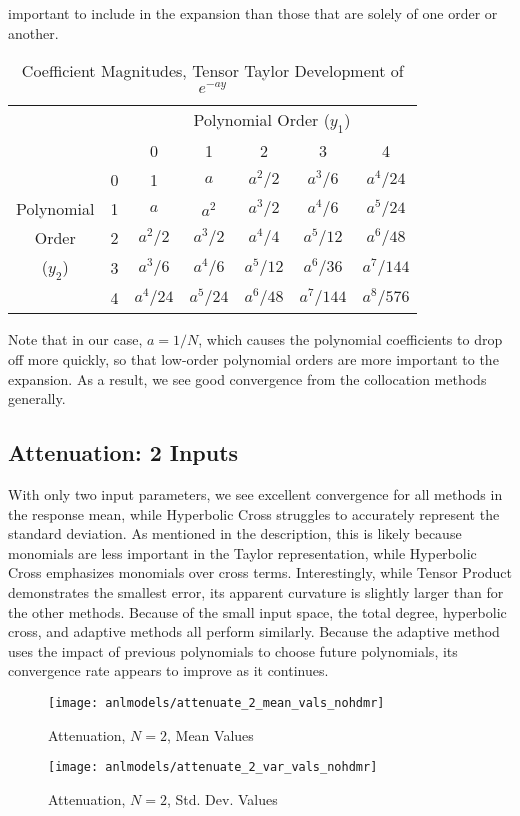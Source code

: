 important to include in the expansion than those that are solely of one order or another.
\begin{table}
  \centering
  \begin{tabular}{|c c|c c c c c|}
    \cline{3-7}\multicolumn{2}{c|}{ } & \multicolumn{5}{c|}{Polynomial Order ($y_1$)} \\
               \multicolumn{2}{c|}{ } & 0 & 1 & 2 & 3 & 4 \\
    \hline & 0 & 1        & $a$      & $a^2/2$  & $a^3/6$   & \cellcolor{Gray6}$a^4/24$  \\
Polynomial & 1 & $a$      & $a^2   $ & $a^3/2 $ & \cellcolor{Gray6}$a^4/6  $ & $a^5/24 $ \\
Order      & 2 & $a^2/2$  & $a^3/2 $ & \cellcolor{Gray6}$a^4/4 $ & $a^5/12 $ & $a^6/48 $ \\
($y_2$)    & 3 & $a^3/ 6$ & \cellcolor{Gray6}$a^4/ 6$ & $a^5/12$ & $a^6/ 36$ & $a^7/144$ \\
           & 4 & \cellcolor{Gray6}$a^4/24$ & $a^5/24$ & $a^6/48$ & $a^7/144$ & $a^8/576$ \\
    \hline
  \end{tabular}
  \caption{Coefficient Magnitudes, Tensor Taylor Development of $e^{-ay}$}
  \label{tab:atten coeffs}
\end{table}
Note that in our case, $a=1/N$, which causes the polynomial coefficients to drop off more quickly, so that
low-order polynomial orders are more important to the expansion.  As a result, we see good convergence from the
collocation methods generally.

\subsection{Attenuation: 2 Inputs}
With only two input parameters, we see excellent convergence for all methods in the response mean, while Hyperbolic
Cross struggles to accurately represent the standard deviation.  As mentioned in the description, this is
likely because monomials are less important in the Taylor representation, while Hyperbolic Cross emphasizes
monomials over cross terms.  Interestingly, while Tensor
Product demonstrates the smallest error, its apparent curvature is slightly larger than for the other methods.
Because of the small input space, the total degree, hyperbolic cross, and adaptive methods all perform
similarly.  Because the adaptive method uses the impact of previous polynomials to choose future polynomials,
its convergence rate appears to improve as it continues.
\begin{figure}[H]
  \centering
  \texttt{[image: anlmodels/attenuate\_2\_mean\_vals\_nohdmr]}
  \caption{Attenuation, $N=2$, Mean Values}
  \label{fig:attenuate mean values 2}
\end{figure}
\begin{figure}[H]
  \centering
  \texttt{[image: anlmodels/attenuate\_2\_var\_vals\_nohdmr]}
  \caption{Attenuation, $N=2$, Std. Dev. Values}
  \label{fig:attenuate var values 2}
\end{figure}

